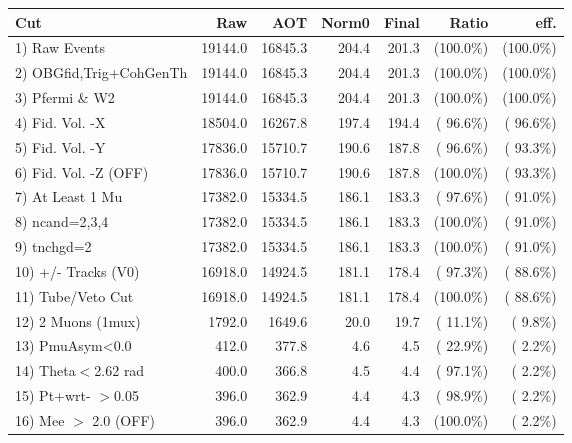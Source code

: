  \begin{table}[h!]\centering
 \begin{tabular}{||l||r|r|r|r|r|r||}
 \hline
 \hline
 Cut & Raw & AOT & Norm0 & Final & Ratio & eff.       \\
 \hline
  1) Raw Events           &      19144.0 &      16845.3 &        204.4 &        201.3 & (100.0\%) & (100.0\%) \\
  2) OBGfid,Trig+CohGenTh &      19144.0 &      16845.3 &        204.4 &        201.3 & (100.0\%) & (100.0\%) \\
  3) Pfermi \& W2         &      19144.0 &      16845.3 &        204.4 &        201.3 & (100.0\%) & (100.0\%) \\
  4) Fid. Vol. -X         &      18504.0 &      16267.8 &        197.4 &        194.4 & ( 96.6\%) & ( 96.6\%) \\
  5) Fid. Vol. -Y         &      17836.0 &      15710.7 &        190.6 &        187.8 & ( 96.6\%) & ( 93.3\%) \\
  6) Fid. Vol. -Z (OFF)   &      17836.0 &      15710.7 &        190.6 &        187.8 & (100.0\%) & ( 93.3\%) \\
  7) At Least 1 Mu        &      17382.0 &      15334.5 &        186.1 &        183.3 & ( 97.6\%) & ( 91.0\%) \\
  8) ncand=2,3,4          &      17382.0 &      15334.5 &        186.1 &        183.3 & (100.0\%) & ( 91.0\%) \\
  9) tnchgd=2             &      17382.0 &      15334.5 &        186.1 &        183.3 & (100.0\%) & ( 91.0\%) \\
 10) +/- Tracks (V0)      &      16918.0 &      14924.5 &        181.1 &        178.4 & ( 97.3\%) & ( 88.6\%) \\
 11) Tube/Veto Cut        &      16918.0 &      14924.5 &        181.1 &        178.4 & (100.0\%) & ( 88.6\%) \\
 12) 2 Muons (1mux)       &       1792.0 &       1649.6 &         20.0 &         19.7 & ( 11.1\%) & (  9.8\%) \\
 13) PmuAsym<0.0          &        412.0 &        377.8 &          4.6 &          4.5 & ( 22.9\%) & (  2.2\%) \\
 14) Theta$<$2.62 rad     &        400.0 &        366.8 &          4.5 &          4.4 & ( 97.1\%) & (  2.2\%) \\
 15) Pt+wrt- $>$0.05      &        396.0 &        362.9 &          4.4 &          4.3 & ( 98.9\%) & (  2.2\%) \\
 16) Mee $>$ 2.0  (OFF)   &        396.0 &        362.9 &          4.4 &          4.3 & (100.0\%) & (  2.2\%) \\

\end{tabular}
\end{table}
